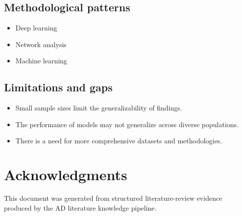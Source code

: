 \documentclass{MITcsail}
\begin{document}
\subsection*{Methodological patterns}
\begin{itemize}
  \item Deep learning
  \item Network analysis
  \item Machine learning
\end{itemize}

\subsection*{Limitations and gaps}
\begin{itemize}
  \item Small sample sizes limit the generalizability of findings.
  \item The performance of models may not generalize across diverse populations.
  \item There is a need for more comprehensive datasets and methodologies.
\end{itemize}

\clearpage

\nocite{ref_10_1523_jneurosci_2250_06_2006,ref_10_1148_radiol_10100734,ref_10_1148_radiol_2016152703,ref_10_1148_radiol_2018180958,ref_10_1111_jon_12214,ref_10_1186_1471_2202_10_101,ref_10_3389_fnagi_2019_00220,ref_10_3389_fpubh_2022_853294,ref_10_1016_j_jalz_2019_02_007,ref_10_1109_isbi_2014_6868045,ref_10_1016_j_bspc_2021_103293,ref_10_1016_j_neuroimage_2014_10_002,ref_10_1109_access_2021_3090474,ref_10_1016_j_neuroimage_2019_01_031,ref_10_1007_978_3_642_40763_5_72,ref_10_1016_j_neuroimage_2014_06_077,ref_10_1371_journal_pcbi_1000100,ref_10_1002_alz_13390}


\section*{Acknowledgments}
This document was generated from structured literature-review evidence produced by the AD literature knowledge pipeline.
\end{document}
